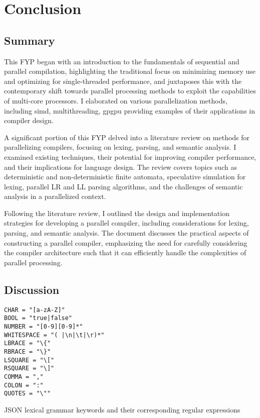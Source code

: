 \chapter{Conclusion} \label{conclusion} 

\section{Summary}

This FYP began with an introduction to the fundamentals of sequential and parallel compilation,
highlighting the traditional focus on minimizing memory use and optimizing for single-threaded
performance, and juxtaposes this with the contemporary shift towards parallel processing methods to
exploit the capabilities of multi-core processors. I elaborated on various parallelization methods,
including \gls{simd}, multithreading, \gls{gpgpu}  providing examples of their applications in
compiler design.

A significant portion of this FYP delved into a literature review on methods for parallelizing
compilers, focusing on lexing, parsing, and semantic analysis. I examined existing techniques, their
potential for improving compiler performance, and their implications for language design. The review
covers topics such as deterministic and non-deterministic finite automata, speculative simulation
for lexing, parallel LR and LL parsing algorithms, and the challenges of semantic analysis in a
parallelized context.

Following the literature review, I outlined the design and implementation strategies for developing
a parallel compiler, including considerations for lexing, parsing, and semantic analysis. The
document discusses the practical aspects of constructing a parallel compiler, emphasizing the
need for carefully considering the compiler architecture such that it can efficiently handle the
complexities of parallel processing.

\section{Discussion}

\begin{listing}[H]
\begin{verbatim}
CHAR = "[a-zA-Z]"
BOOL = "true|false"
NUMBER = "[0-9][0-9]*"
WHITESPACE = "( |\n|\t|\r)*"
LBRACE = "\{"
RBRACE = "\}"
LSQUARE = "\["
RSQUARE = "\]"
COMMA = ","
COLON = ":"
QUOTES = "\""
\end{verbatim}
\caption{JSON lexical grammar keywords and their corresponding regular expressions}
\label{lst:json_lexical_grammar}
\end{listing}

